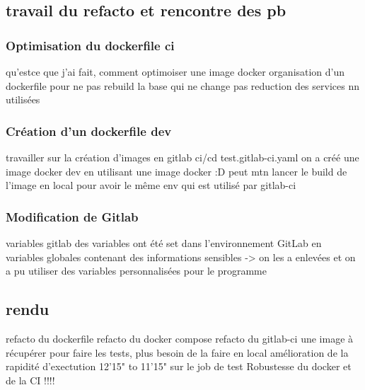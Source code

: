 \subsection{travail du refacto et rencontre des pb}
\subsubsection{Optimisation du dockerfile ci}
qu'estce que j'ai fait, comment optimoiser une image docker
    organisation d'un dockerfile pour ne pas rebuild la base qui ne change pas
    reduction des services nn utilisées

\subsubsection{Création d'un dockerfile dev}
travailler sur la création d'images en gitlab ci/cd test.gitlab-ci.yaml
    on a créé une image docker dev en utilisant une image docker :D
    peut mtn lancer le build de l'image en local pour avoir le même env qui est utilisé par gitlab-ci

\subsubsection{Modification de Gitlab}
variables gitlab
    des variables ont été set dans l'environnement GitLab en variables globales contenant des informations sensibles
    -> on les a enlevées et on a pu utiliser des variables personnalisées pour le programme

\subsection{rendu}
refacto du dockerfile
refacto du docker compose
refacto du gitlab-ci
    une image à récupérer pour faire les tests, plus besoin de la faire en local
    amélioration de la rapidité d'exectution 12'15" to 11'15" sur le job de test
    Robustesse du docker et de la CI !!!!
